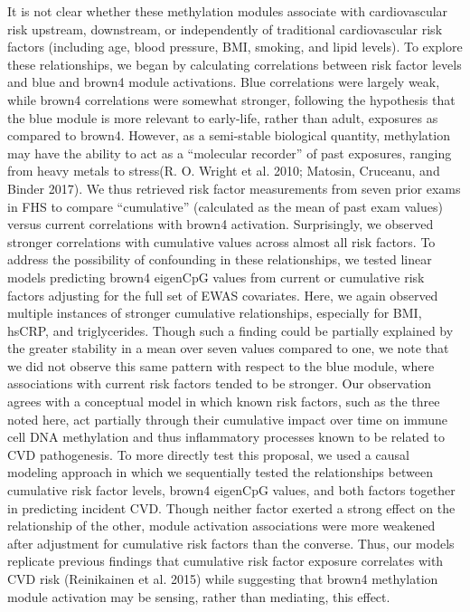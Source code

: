 \documentclass[]{article}
\theoremstyle{definition}
\theoremstyle{definition}
\theoremstyle{definition}
\theoremstyle{remark}
\begin{document}
It is not clear whether these methylation modules associate with
cardiovascular risk upstream, downstream, or independently of
traditional cardiovascular risk factors (including age, blood pressure,
BMI, smoking, and lipid levels). To explore these relationships, we
began by calculating correlations between risk factor levels and blue
and brown4 module activations. Blue correlations were largely weak,
while brown4 correlations were somewhat stronger, following the
hypothesis that the blue module is more relevant to early-life, rather
than adult, exposures as compared to brown4. However, as a semi-stable
biological quantity, methylation may have the ability to act as a
``molecular recorder'' of past exposures, ranging from heavy metals to
stress(R. O. Wright et al. 2010; Matosin, Cruceanu, and Binder 2017). We
thus retrieved risk factor measurements from seven prior exams in FHS to
compare ``cumulative'' (calculated as the mean of past exam values)
versus current correlations with brown4 activation. Surprisingly, we
observed stronger correlations with cumulative values across almost all
risk factors. To address the possibility of confounding in these
relationships, we tested linear models predicting brown4 eigenCpG values
from current or cumulative risk factors adjusting for the full set of
EWAS covariates. Here, we again observed multiple instances of stronger
cumulative relationships, especially for BMI, hsCRP, and triglycerides.
Though such a finding could be partially explained by the greater
stability in a mean over seven values compared to one, we note that we
did not observe this same pattern with respect to the blue module, where
associations with current risk factors tended to be stronger. Our
observation agrees with a conceptual model in which known risk factors,
such as the three noted here, act partially through their cumulative
impact over time on immune cell DNA methylation and thus inflammatory
processes known to be related to CVD pathogenesis. To more directly test
this proposal, we used a causal modeling approach in which we
sequentially tested the relationships between cumulative risk factor
levels, brown4 eigenCpG values, and both factors together in predicting
incident CVD. Though neither factor exerted a strong effect on the
relationship of the other, module activation associations were more
weakened after adjustment for cumulative risk factors than the converse.
Thus, our models replicate previous findings that cumulative risk factor
exposure correlates with CVD risk (Reinikainen et al. 2015) while
suggesting that brown4 methylation module activation may be sensing,
rather than mediating, this effect.
\end{document}
